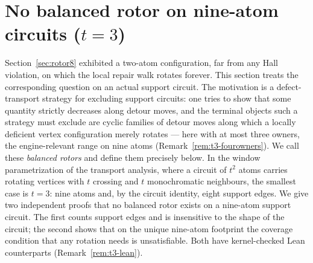 
\section{No balanced rotor on nine-atom circuits
(\texorpdfstring{\(t=3\)}{t=3})}\label{sec:t3closure}

Section~\ref{sec:rotor8} exhibited a two-atom configuration, far from
any Hall violation, on which the local repair walk rotates forever.
This section treats the corresponding question on an actual support
circuit. The motivation is a defect-transport strategy for excluding
support circuits: one tries to show that some quantity strictly
decreases along detour moves, and the terminal objects such a strategy
must exclude are cyclic families of detour moves along which a locally
deficient vertex configuration merely rotates --- here with at most
three owners, the engine-relevant range on nine atoms
(Remark~\ref{rem:t3-fourowners}). We call these
\emph{balanced rotors} and define them precisely below. In the window
parametrization of the transport analysis, where a circuit of \(t^2\)
atoms carries rotating vertices with \(t\) crossing and \(t\)
monochromatic neighbours, the smallest case is \(t=3\): nine atoms and,
by the circuit identity, eight support edges. We give two independent
proofs that no balanced rotor exists on a nine-atom support circuit.
The first counts support edges and is insensitive to the shape of the
circuit; the second shows that on the unique nine-atom footprint the
coverage condition that any rotation needs is unsatisfiable. Both have
kernel-checked Lean counterparts (Remark~\ref{rem:t3-lean}).

